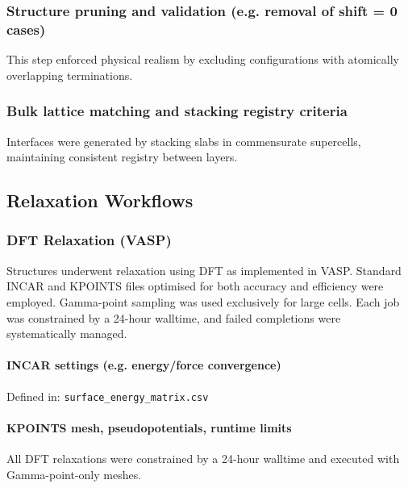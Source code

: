 \subsubsection{Structure pruning and validation (e.g. removal of shift = 0 cases)}

This step enforced physical realism by excluding configurations with atomically overlapping terminations.

\subsubsection{Bulk lattice matching and stacking registry criteria}

Interfaces were generated by stacking slabs in commensurate supercells, maintaining consistent registry between layers.

\subsection{Relaxation Workflows}

\subsubsection{DFT Relaxation (VASP)}

Structures underwent relaxation using DFT as implemented in VASP. Standard INCAR and KPOINTS files optimised for both
accuracy and efficiency were employed. Gamma-point sampling was used exclusively for large cells. Each job was
constrained by a 24-hour walltime, and failed completions were systematically managed.

\paragraph{INCAR settings (e.g. energy/force convergence)}

Defined in: \texttt{surface\_energy\_matrix.csv}


\paragraph{KPOINTS mesh, pseudopotentials, runtime limits}

All DFT relaxations were constrained by a 24-hour walltime and executed with Gamma-point-only meshes.


